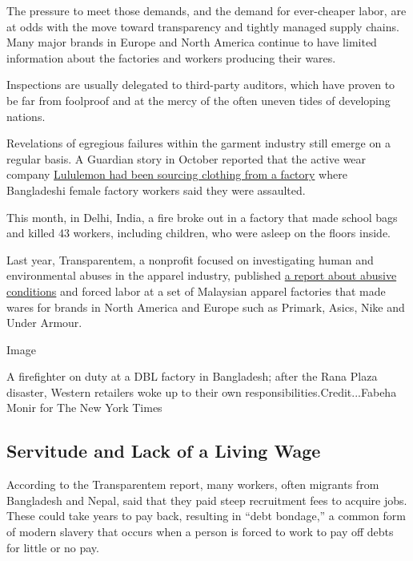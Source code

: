 The pressure to meet those demands, and the demand for ever-cheaper
labor, are at odds with the move toward transparency and tightly managed
supply chains. Many major brands in Europe and North America continue to
have limited information about the factories and workers producing their
wares.

Inspections are usually delegated to third-party auditors, which have
proven to be far from foolproof and at the mercy of the often uneven
tides of developing nations.

Revelations of egregious failures within the garment industry still
emerge on a regular basis. A Guardian story in October reported that the
active wear company
\href{https://www.theguardian.com/global-development/2019/oct/14/workers-making-lululemon-leggings-claim-they-are-beaten}{Lululemon
had been sourcing clothing from a factory} where Bangladeshi female
factory workers said they were assaulted.

This month, in Delhi, India, a fire broke out in a factory that made
school bags and killed 43 workers, including children, who were asleep
on the floors inside.

Last year, Transparentem, a nonprofit focused on investigating human and
environmental abuses in the apparel industry, published
\href{https://www.transparentem.com/projects/}{a report about abusive
conditions} and forced labor at a set of Malaysian apparel factories
that made wares for brands in North America and Europe such as Primark,
Asics, Nike and Under Armour.

Image

A firefighter on duty at a DBL factory in Bangladesh; after the Rana
Plaza disaster, Western retailers woke up to their own
responsibilities.Credit...Fabeha Monir for The New York Times

\hypertarget{servitude-and-lack-of-a-living-wage}{%
\subsection{Servitude and Lack of a Living
Wage}\label{servitude-and-lack-of-a-living-wage}}

According to the Transparentem report, many workers, often migrants from
Bangladesh and Nepal, said that they paid steep recruitment fees to
acquire jobs. These could take years to pay back, resulting in ``debt
bondage,'' a common form of modern slavery that occurs when a person is
forced to work to pay off debts for little or no pay.


